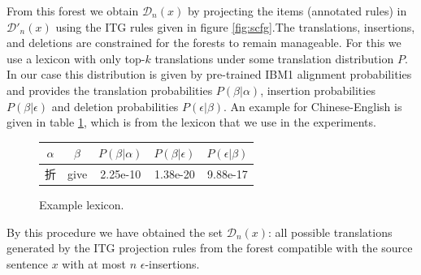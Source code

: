 \documentclass[11pt,a4paper]{article}
\begin{document}
From this forest we obtain $\mathcal{D}_n(x)$ by projecting the items (annotated rules) in $\mathcal{D}'_n(x)$ using the ITG rules given in figure \ref{fig:scfg}.The translations, insertions, and deletions are constrained for the forests to remain manageable. For this we use a lexicon with only top-$k$ translations under some translation distribution $P$. In our case this distribution is given by pre-trained IBM1 alignment probabilities and provides the translation probabilities $P(\beta | \alpha)$, insertion probabilities $P(\beta | \epsilon)$ and deletion probabilities $P(\epsilon | \beta)$. An example for Chinese-English is given in table \ref{table:lexicon}, which is from the lexicon that we use in the experiments.
\begin{figure}[H]
\centering
\begin{CJK}{UTF8}{gbsn}
\begin{tabular}{c|c|c|c|c}
$\alpha$  & $\beta$ & $P(\beta | \alpha)$ & $P(\beta | \epsilon)$ & $P(\epsilon | \beta)$ \\ \hline
折 & give & 2.25e-10 & 1.38e-20 & 9.88e-17 \\
\end{tabular}
\end{CJK}
\caption{Example lexicon.}
\label{table:lexicon}
\end{figure}
By this procedure we have obtained the set $\mathcal{D}_n(x)$: all possible translations generated by the ITG projection rules from the forest compatible with the source sentence $x$ with at most $n$ $\epsilon$-insertions.


\end{document}
